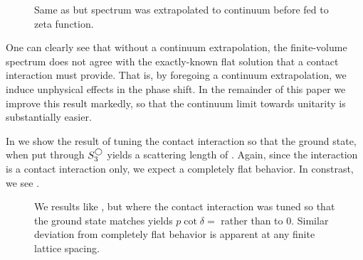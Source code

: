 \begin{figure}[th]
    
    \caption{Same as  but spectrum was extrapolated to continuum before fed to zeta function.}
    \label{fig:unimproved spherical continuum extrapolation}
\end{figure}

One can clearly see that without a continuum extrapolation, the finite-volume spectrum does not agree with the exactly-known flat solution that a contact interaction must provide.
That is, by foregoing a continuum extrapolation, we induce unphysical effects in the phase shift.
In the remainder of this paper we improve this result markedly, so that the continuum limit towards unitarity is substantially easier.


In  we show the result of tuning the contact interaction so that the ground state, when put through $S^{\bigcirc}_3$ yields a scattering length of .
Again, since the interaction is a contact interaction only, we expect a completely flat behavior.
In constrast, we see .

\begin{figure}[th]
    
    \caption{We results like , but where the contact interaction was tuned so that the ground state matches yields $p\cot\delta = $ rather than to 0.  Similar deviation from completely flat behavior is apparent at any finite lattice spacing.}
    \label{fig:finite a spherical}
\end{figure}
 
